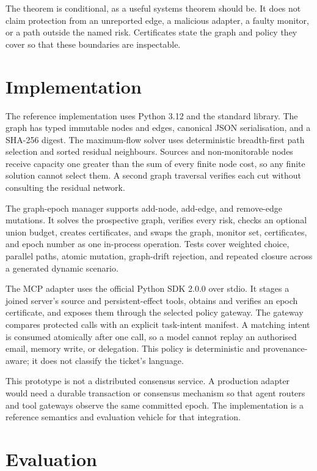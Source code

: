 \documentclass[10pt,journal,compsoc]{IEEEtran}
\begin{document}
The theorem is conditional, as a useful systems theorem should be.  It does
not claim protection from an unreported edge, a malicious adapter, a faulty
monitor, or a path outside the named risk.  Certificates state the graph and
policy they cover so that these boundaries are inspectable.

\section{Implementation}

The reference implementation uses Python 3.12 and the standard library.  The
graph has typed immutable nodes and edges, canonical JSON serialisation, and a
SHA-256 digest.  The maximum-flow solver uses deterministic breadth-first path
selection and sorted residual neighbours.  Sources and non-monitorable nodes
receive capacity one greater than the sum of every finite node cost, so any
finite solution cannot select them.  A second graph traversal verifies each
cut without consulting the residual network.

The graph-epoch manager supports add-node, add-edge, and remove-edge mutations.
It solves the prospective graph, verifies every risk, checks an optional union
budget, creates certificates, and swaps the graph, monitor set, certificates,
and epoch number as one in-process operation.  Tests cover weighted choice,
parallel paths, atomic mutation, graph-drift rejection, and repeated closure
across a generated dynamic scenario.

The MCP adapter uses the official Python SDK 2.0.0 over stdio.  It stages a
joined server's source and persistent-effect tools, obtains and verifies an
epoch certificate, and exposes them through the selected policy gateway.  The
gateway compares protected calls with an explicit task-intent manifest.  A
matching intent is consumed atomically after one call, so a model cannot replay
an authorised email, memory write, or delegation.  This policy is deterministic
and provenance-aware; it does not classify the ticket's language.

This prototype is not a distributed consensus service.  A production adapter
would need a durable transaction or consensus mechanism so that agent routers
and tool gateways observe the same committed epoch.  The implementation is a
reference semantics and evaluation vehicle for that integration.

\section{Evaluation}
\end{document}
